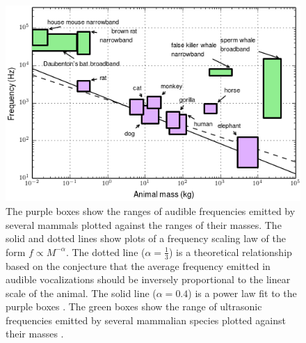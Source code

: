 \documentclass[superscriptaddress, twocolumn, prl]{revtex4}
\begin{document}
\begin{figure}[!ht]
\centering
\includegraphics[width=\columnwidth]{frequency_scaling.png}
\caption{\label{fig:frequency_scaling} The purple boxes show the ranges of audible frequencies emitted by several mammals plotted against the ranges of their masses. The solid and dotted lines show plots of a frequency scaling law of the form $f\propto M^{-\alpha}$. The dotted line ($\alpha=\frac{1}{3}$) is a theoretical relationship based on the conjecture that the average frequency emitted in audible vocalizations should be inversely proportional to the linear scale of the animal. The solid line ($\alpha=0.4$) is a power law fit to the purple boxes \cite{Brudzynski2010}. The green boxes show the range of ultrasonic frequencies emitted by several mammalian species plotted against their masses \cite{Fletcher2010, white1998,berry1970natural,Fenton1998,Jones2006,bogdanowicz1994,Frankel2009,Whitehead2009,Rendell1999,Kastelein2000,Jefferson1993}.}
\end{figure}
\end{document}
